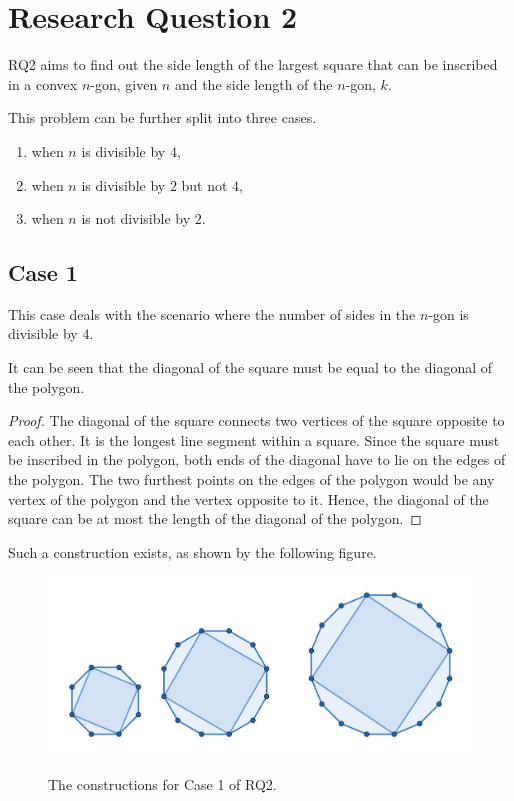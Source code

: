 \documentclass[12pt]{scrartcl}
\begin{document}
\section{Research Question 2}

RQ2 aims to find out the side length of the largest square that can be inscribed in a convex $n$-gon,
given $n$ and the side length of the $n$-gon, $k$.

This problem can be further split into three cases.
\begin{enumerate}
	\item when $n$ is divisible by $4$,
	\item when $n$ is divisible by $2$ but not $4$,
	\item when $n$ is not divisible by $2$.
\end{enumerate}

\subsection{Case 1}
This case deals with the scenario where the number of sides in the $n$-gon is
divisible by $4$.

It can be seen that the diagonal of the square must be equal to the diagonal of the polygon.
\begin{proof}
	The diagonal of the square connects two vertices of the square opposite to each other.
	It is the longest line segment within a square.
	Since the square must be inscribed in the polygon, both ends of the diagonal have to lie on the edges of the polygon.
	The two furthest points on the edges of the polygon would be any vertex of the polygon and the vertex opposite to it.
	Hence, the diagonal of the square can be at most the length of the diagonal of the polygon.
\end{proof}

Such a construction exists, as shown by the following figure.
\begin{figure}[htpb]
	\centering
	\includegraphics[scale=.65]{images/rq2_1_1.jpg}
	\label{fig:rq2_1_1_img}
	\caption{The constructions for Case 1 of RQ2.}
\end{figure}
\end{document}
